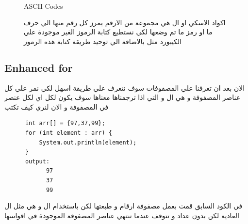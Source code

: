 \begin{figure}[b]
  \begin{enrichment*}{ASCII Codes}
  \begin{AR}
    اكواد الاسكي او ال  هي مجموعة من الارقم يمرز كل رقم منها الي حرف ما او رمز ما 
    تم وضعها لكي نستطيع كتابة الرموز الغير موجودة علي الكيبورد مثل \LR{$\Sigma , \gamma , \spadesuit , \clubsuit , \measuredangle $} بالاضافة الي 
    توحيد طريقة كتابة هذه الرموز
  \end{AR}
\end{enrichment*}
\end{figure}
\subsection{Enhanced for}
\begin{AR}
    الان بعد ان تعرفنا علي المصفوفات سوف نتعرف علي طريقة اسهل لكي نمر علي 
    كل عناصر المصفوفة و هي ال  و التي اذا ترجمناها معناها سوف يكون لكل اي
    لكل عنصر في المصفوفة و الان لنري كيف تكتب
\end{AR}
\begin{verbatim}
      int arr[] = {97,37,99};
      for (int element : arr) {
          System.out.println(element);
      }
      output:
            97
            37
            99
\end{verbatim}  
\begin{AR}
    في الكود السابق قمت بعمل مصفوفة ارقام و طبعتها لكن 
    باستخدام ال  و هي مثل ال  العادية لكن بدون عداد و تتوقف عندما تنتهي 
    عناصر المصفوفة الموجودة في اقواسها
\end{AR}
